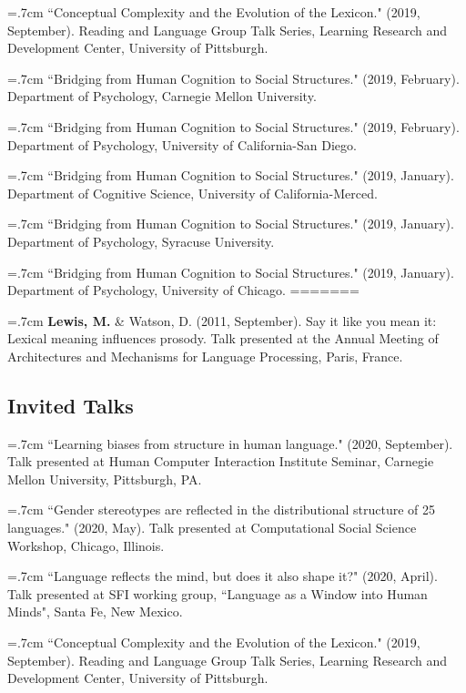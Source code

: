 \documentclass[letterpaper]{article}
\begin{document}
\hangindent=.7cm ``Conceptual Complexity and the Evolution of the Lexicon." (2019, September). Reading and Language Group Talk Series, Learning Research and Development Center, University of Pittsburgh.

\hangindent=.7cm ``Bridging from Human Cognition to Social Structures." (2019, February). Department of Psychology, Carnegie Mellon University. 

\hangindent=.7cm ``Bridging from Human Cognition to Social Structures." (2019, February). Department of Psychology, University of California-San Diego. 

\hangindent=.7cm ``Bridging from Human Cognition to Social Structures." (2019, January). Department of Cognitive Science, University of California-Merced. 

\hangindent=.7cm ``Bridging from Human Cognition to Social Structures." (2019, January). Department of Psychology, Syracuse University. 

\hangindent=.7cm ``Bridging from Human Cognition to Social Structures." (2019, January). Department of Psychology, University of Chicago. 
=======

 \hangindent=.7cm {\bf Lewis, M.}  \& Watson, D. (2011, September). Say it like you mean it: Lexical meaning influences prosody. Talk presented at the Annual Meeting of Architectures and Mechanisms for Language Processing, Paris, France.


\subsection*{Invited Talks}

\hangindent=.7cm ``Learning biases from structure in human language." (2020, September). Talk presented at Human Computer Interaction Institute Seminar, Carnegie Mellon University, Pittsburgh, PA.

\hangindent=.7cm ``Gender stereotypes are reflected in the distributional structure of 25 languages." (2020, May). Talk presented at Computational Social Science Workshop, Chicago, Illinois.

\hangindent=.7cm ``Language reflects the mind, but does it also shape it?" (2020, April). Talk presented at SFI working group, ``Language as a Window into Human Minds", Santa Fe, New Mexico.

\hangindent=.7cm ``Conceptual Complexity and the Evolution of the Lexicon." (2019, September). Reading and Language Group Talk Series, Learning Research and Development Center, University of Pittsburgh.
\end{document}
